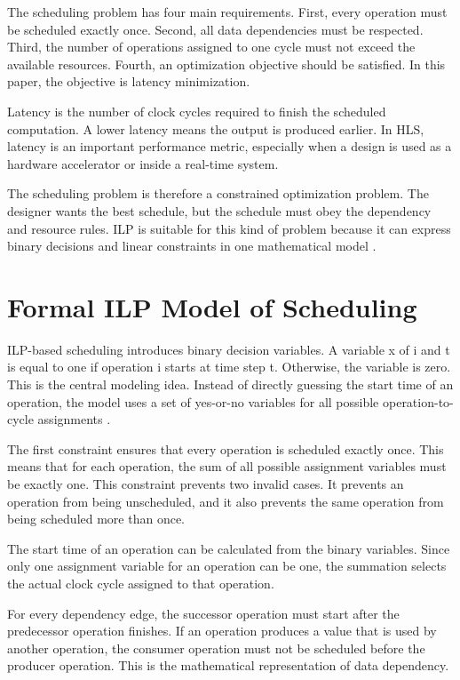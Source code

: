 \documentclass[conference]{IEEEtran}
\begin{document}
	The scheduling problem has four main requirements. First, every operation must be scheduled exactly once. Second, all data dependencies must be respected. Third, the number of operations assigned to one cycle must not exceed the available resources. Fourth, an optimization objective should be satisfied. In this paper, the objective is latency minimization.
	
	Latency is the number of clock cycles required to finish the scheduled computation. A lower latency means the output is produced earlier. In HLS, latency is an important performance metric, especially when a design is used as a hardware accelerator or inside a real-time system.
	
	The scheduling problem is therefore a constrained optimization problem. The designer wants the best schedule, but the schedule must obey the dependency and resource rules. ILP is suitable for this kind of problem because it can express binary decisions and linear constraints in one mathematical model \cite{teich,demicheli}.
	
	\section{Formal ILP Model of Scheduling}
	
	ILP-based scheduling introduces binary decision variables. A variable x of i and t is equal to one if operation i starts at time step t. Otherwise, the variable is zero. This is the central modeling idea. Instead of directly guessing the start time of an operation, the model uses a set of yes-or-no variables for all possible operation-to-cycle assignments \cite{teich,demicheli}.
	
	The first constraint ensures that every operation is scheduled exactly once. This means that for each operation, the sum of all possible assignment variables must be exactly one. This constraint prevents two invalid cases. It prevents an operation from being unscheduled, and it also prevents the same operation from being scheduled more than once.
	
	The start time of an operation can be calculated from the binary variables. Since only one assignment variable for an operation can be one, the summation selects the actual clock cycle assigned to that operation.
	
	For every dependency edge, the successor operation must start after the predecessor operation finishes. If an operation produces a value that is used by another operation, the consumer operation must not be scheduled before the producer operation. This is the mathematical representation of data dependency.
	
\end{document}
